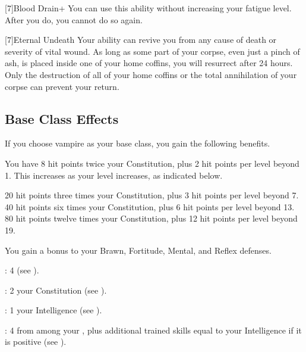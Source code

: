     [7]{Blood Drain+} You can use this ability without increasing your fatigue level.
    After you do, you  cannot do so again.

    [7]{Eternal Undeath} Your  ability can revive you from any cause of death or severity of vital wound.
      As long as some part of your corpse, even just a pinch of ash, is placed inside one of your home coffins, you will resurrect after 24 hours.
      Only the destruction of all of your home coffins or the total annihilation of your corpse can prevent your return.

  \subsection{Base Class Effects}
    \highhpprogressiontable

    If you choose vampire as your base class, you gain the following benefits.

      You have 8 hit points \add twice your Constitution, plus 2 hit points per level beyond 1.
      This increases as your level increases, as indicated below.
      \begin{raggeditemize}
         20 hit points \add three times your Constitution, plus 3 hit points per level beyond 7.
         40 hit points \add six times your Constitution, plus 6 hit points per level beyond 13.
         80 hit points \add twelve times your Constitution, plus 12 hit points per level beyond 19.
      \end{raggeditemize}

      You gain a  bonus to your Brawn, Fortitude, Mental, and Reflex defenses.

      \begin{raggeditemize}
          \item {}: 4 (see ).
          \item {}: 2 \add your Constitution (see ).
          \item {}: 1 \add your Intelligence (see ).
          \item {}: 4 from among your , plus additional trained skills equal to your Intelligence if it is positive (see ).
      \end{raggeditemize}

